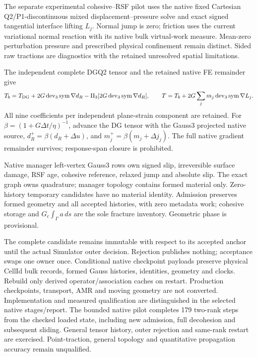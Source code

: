 \documentclass[11pt]{article}
\begin{document}
The separate experimental cohesive--RSF pilot uses the native fixed Cartesian
Q2/P1-discontinuous mixed displacement--pressure solve and exact signed tangential
interface lifting $L_j$. Normal jump is zero; friction uses the current variational
normal reaction with its native bulk virtual-work measure. Mean-zero perturbation
pressure and prescribed physical confinement remain distinct. Sided raw tractions
are diagnostics with the retained unresolved spatial limitations.

The independent complete DGQ2 tensor and the retained native FE remainder give
\[
 T_b=T_{\rm DG}+2G\operatorname{dev}_3\operatorname{sym}\nabla d_R
 -\Pi_3[2G\operatorname{dev}_3\operatorname{sym}\nabla d_R],\qquad
 T=T_b+2G\sum_jm_j\operatorname{dev}_3\operatorname{sym}\nabla L_j.
\]
All nine coefficients per independent plane-strain component are retained.
For $\beta=(1+G\Delta t/\eta)^{-1}$, advance the DG tensor with the Gauss3 projected
native source, $d_R^+=\beta(d_R+\Delta u)$, and $m_j^+=\beta(m_j+\Delta j_j)$.
The full native gradient remainder survives; response-span closure is prohibited.

Native manager left-vertex Gauss3 rows own signed slip, irreversible surface damage,
RSF age, cohesive reference, relaxed jump and absolute slip. The exact graph owns
quadrature; manager topology contains formed material only. Zero-history temporary
candidates have no material identity. Admission preserves formed geometry and all
accepted histories, with zero metadata work; cohesive storage and
$G_c\int_\Gamma a\,ds$ are the sole fracture inventory. Geometric phase is provisional.

The complete candidate remains immutable with respect to its accepted anchor until
the actual Simulator outer decision. Rejection publishes nothing; acceptance swaps
one owner once. Conditional native checkpoint payloads preserve physical CellId
bulk records, formed Gauss histories, identities, geometry and clocks. Rebuild
only derived operator/association caches on restart. Production checkpoints,
transport, AMR and moving geometry are not converted. Implementation and measured
qualification are distinguished in the selected native stages/report. The bounded
native pilot completes 179 two-rank steps from the checked loaded state, including
new admission, full decohesion and subsequent sliding. General tensor history,
outer rejection and same-rank restart are exercised. Point-traction, general
topology and quantitative propagation accuracy remain unqualified.
\end{document}
